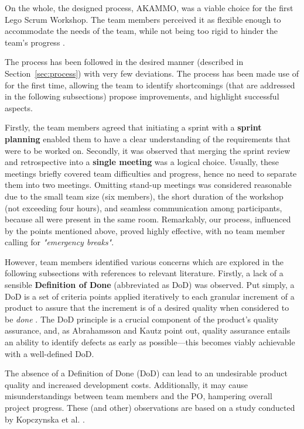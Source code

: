 \documentclass[conference]{IEEEtran}
\begin{document}
On the whole, the designed process, {\selectfont AKAMMO},
was a viable choice for the first Lego Scrum Workshop. The team members perceived
it as flexible enough to accommodate the needs of the team, while not being too
rigid to hinder the team's progress \cite{DIT348A2}.

The process has been followed in the desired manner (described in
Section~\ref{sec:process}) with very few deviations. The process has
been made use of for the first time, allowing the team to identify shortcomings
(that are addressed in the following subsections) propose improvements, and
highlight successful aspects. 

Firstly, the team members agreed that initiating a sprint with a \textbf{sprint
planning} enabled them to have a clear understanding of the requirements that
were to be worked on. Secondly, it was observed that merging the sprint review
and retrospective into a \textbf{single meeting} was a logical choice. Usually,
these meetings briefly covered team difficulties and progress, hence no need to
separate them into two meetings. Omitting stand-up meetings was considered
reasonable due to the small team size (six members), the short duration of the
workshop (not exceeding four hours), and seamless communication among
participants, because all were present in the same room. Remarkably, our
process, influenced by the points mentioned above, proved highly effective,
with no team member calling for \textit{"emergency breaks"}.

However, team members identified various concerns which are explored in the
following subsections with references to relevant literature. Firstly, a lack
of a sensible \textbf{Definition of Done} (abbreviated as DoD) was observed.
Put simply, a DoD is a set of criteria points applied iteratively to each
granular increment of a product to assure that the increment is of a desired
quality when considered to be \textit{done} \cite{Kopczynska2022}. The DoD
principle is a crucial component of the product's quality assurance, and, as
Abrahamsson and Kautz \cite{Abrahamsson2002} point out, quality assurance
entails an ability to identify defects as early as possible---this becomes
viably achievable with a well-defined DoD.

The absence of a Definition of Done (DoD) can lead to an undesirable product
quality and increased development costs. Additionally, it may cause
misunderstandings between team members and the PO, hampering overall project
progress. These (and other) observations are based on a study conducted by
Kopczynska et al. \cite{Kopczynska2022}.
\end{document}
